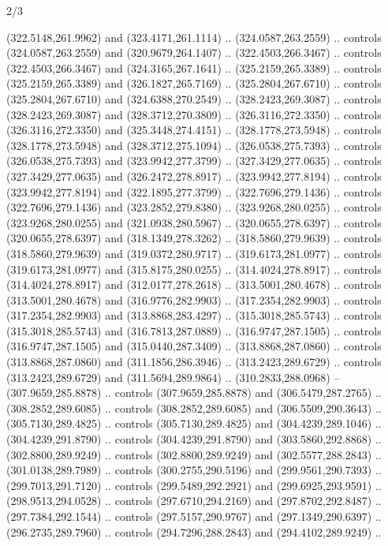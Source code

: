 \begin{flagdescription}{2/3}
\begin{scope}[xshift=0.5\flaglength,yshift=0.5\flagwidth,scale=\flagwidth/318.91]
\begin{scope}[y=0.8pt, x=0.8pt, yscale=-1,shift={(-298.97,-199.32)}]
  (322.5148,261.9962) and (323.4171,261.1114) .. (324.0587,263.2559) .. controls
  (324.0587,263.2559) and (320.9679,264.1407) .. (322.4503,266.3467) .. controls
  (322.4503,266.3467) and (324.3165,267.1641) .. (325.2159,265.3389) .. controls
  (325.2159,265.3389) and (326.1827,265.7169) .. (325.2804,267.6710) .. controls
  (325.2804,267.6710) and (324.6388,270.2549) .. (328.2423,269.3087) .. controls
  (328.2423,269.3087) and (328.3712,270.3809) .. (326.3116,272.3350) .. controls
  (326.3116,272.3350) and (325.3448,274.4151) .. (328.1778,273.5948) .. controls
  (328.1778,273.5948) and (328.3712,275.1094) .. (326.0538,275.7393) .. controls
  (326.0538,275.7393) and (323.9942,277.3799) .. (327.3429,277.0635) .. controls
  (327.3429,277.0635) and (326.2472,278.8917) .. (323.9942,277.8194) .. controls
  (323.9942,277.8194) and (322.1895,277.3799) .. (322.7696,279.1436) .. controls
  (322.7696,279.1436) and (323.2852,279.8380) .. (323.9268,280.0255) .. controls
  (323.9268,280.0255) and (321.0938,280.5967) .. (320.0655,278.6397) .. controls
  (320.0655,278.6397) and (318.1349,278.3262) .. (318.5860,279.9639) .. controls
  (318.5860,279.9639) and (319.0372,280.9717) .. (319.6173,281.0977) .. controls
  (319.6173,281.0977) and (315.8175,280.0255) .. (314.4024,278.8917) .. controls
  (314.4024,278.8917) and (312.0177,278.2618) .. (313.5001,280.4678) .. controls
  (313.5001,280.4678) and (316.9776,282.9903) .. (317.2354,282.9903) .. controls
  (317.2354,282.9903) and (313.8868,283.4297) .. (315.3018,285.5743) .. controls
  (315.3018,285.5743) and (316.7813,287.0889) .. (316.9747,287.1505) .. controls
  (316.9747,287.1505) and (315.0440,287.3409) .. (313.8868,287.0860) .. controls
  (313.8868,287.0860) and (311.1856,286.3946) .. (313.2423,289.6729) .. controls
  (313.2423,289.6729) and (311.5694,289.9864) .. (310.2833,288.0968) --
  (307.9659,285.8878) .. controls (307.9659,285.8878) and (306.5479,287.2765) ..
  (308.2852,289.6085) .. controls (308.2852,289.6085) and (306.5509,290.3643) ..
  (305.7130,289.4825) .. controls (305.7130,289.4825) and (304.4239,289.1046) ..
  (304.4239,291.8790) .. controls (304.4239,291.8790) and (303.5860,292.8868) ..
  (302.8800,289.9249) .. controls (302.8800,289.9249) and (302.5577,288.2843) ..
  (301.0138,289.7989) .. controls (300.2755,290.5196) and (299.9561,290.7393) ..
  (299.7013,291.7120) .. controls (299.5489,292.2921) and (299.6925,293.9591) ..
  (298.9513,294.0528) .. controls (297.6710,294.2169) and (297.8702,292.8487) ..
  (297.7384,292.1544) .. controls (297.5157,290.9767) and (297.1349,290.6397) ..
  (296.2735,289.7960) .. controls (294.7296,288.2843) and (294.4102,289.9249) ..

\end{scope}
\end{scope}
\end{flagdescription}
